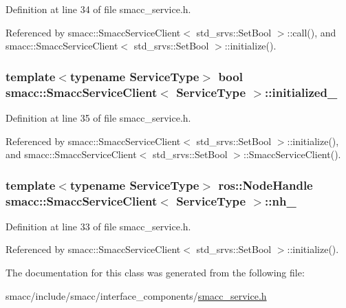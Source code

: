 Definition at line 34 of file smacc\+\_\+service.\+h.



Referenced by smacc\+::\+Smacc\+Service\+Client$<$ std\+\_\+srvs\+::\+Set\+Bool $>$\+::call(), and smacc\+::\+Smacc\+Service\+Client$<$ std\+\_\+srvs\+::\+Set\+Bool $>$\+::initialize().

\subsubsection[{\texorpdfstring{initialized\+\_\+}{initialized_}}]{\setlength{\rightskip}{0pt plus 5cm}template$<$typename Service\+Type$>$ {\bf bool} {\bf smacc\+::\+Smacc\+Service\+Client}$<$ Service\+Type $>$\+::initialized\+\_\+\hspace{0.3cm}{\ttfamily [protected]}}\hypertarget{classsmacc_1_1SmaccServiceClient_a251b147a783f05d13edb272b85f64982}{}\label{classsmacc_1_1SmaccServiceClient_a251b147a783f05d13edb272b85f64982}


Definition at line 35 of file smacc\+\_\+service.\+h.



Referenced by smacc\+::\+Smacc\+Service\+Client$<$ std\+\_\+srvs\+::\+Set\+Bool $>$\+::initialize(), and smacc\+::\+Smacc\+Service\+Client$<$ std\+\_\+srvs\+::\+Set\+Bool $>$\+::\+Smacc\+Service\+Client().

\subsubsection[{\texorpdfstring{nh\+\_\+}{nh_}}]{\setlength{\rightskip}{0pt plus 5cm}template$<$typename Service\+Type$>$ ros\+::\+Node\+Handle {\bf smacc\+::\+Smacc\+Service\+Client}$<$ Service\+Type $>$\+::nh\+\_\+\hspace{0.3cm}{\ttfamily [protected]}}\hypertarget{classsmacc_1_1SmaccServiceClient_a6e5e8b77b4c7137f9c820b09c8f661b5}{}\label{classsmacc_1_1SmaccServiceClient_a6e5e8b77b4c7137f9c820b09c8f661b5}


Definition at line 33 of file smacc\+\_\+service.\+h.



Referenced by smacc\+::\+Smacc\+Service\+Client$<$ std\+\_\+srvs\+::\+Set\+Bool $>$\+::initialize().



The documentation for this class was generated from the following file\+:\begin{DoxyCompactItemize}
\item 
smacc/include/smacc/interface\+\_\+components/\hyperlink{smacc__service_8h}{smacc\+\_\+service.\+h}\end{DoxyCompactItemize}
